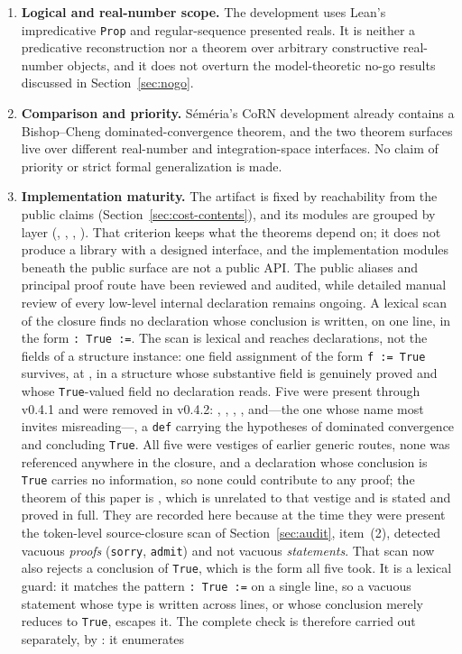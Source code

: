 \documentclass[11pt]{article}
\theoremstyle{definition}
\theoremstyle{remark}
\begin{document}
\begin{enumerate}[label=(\arabic*)]
\item \textbf{Logical and real-number scope.}  The development uses Lean's impredicative \texttt{Prop} and regular-sequence presented reals.  It is neither a predicative reconstruction nor a theorem over arbitrary constructive real-number objects, and it does not overturn the model-theoretic no-go results discussed in Section~\ref{sec:nogo}.

\item \textbf{Comparison and priority.}  S\'em\'eria's CoRN development already contains a Bishop--Cheng dominated-convergence theorem, and the two theorem surfaces live over different real-number and integration-space interfaces.  No claim of priority or strict formal generalization is made.

\item \textbf{Implementation maturity.}  The artifact is fixed by reachability from the public claims (Section~\ref{sec:cost-contents}), and its modules are grouped by layer (, , , ).  That criterion keeps what the theorems depend on; it does not produce a library with a designed interface, and the implementation modules beneath the public surface are not a public API.  The public aliases and principal proof route have been reviewed and audited, while detailed manual review of every low-level internal declaration remains ongoing.  A lexical scan of the closure finds no declaration whose conclusion is written, on one line, in the form \texttt{: True :=}.  The scan is lexical and reaches declarations, not the fields of a structure instance: one field assignment of the form \texttt{f := True} survives, at , in a structure whose substantive field is genuinely proved and whose \texttt{True}-valued field no declaration reads.  Five were present through v0.4.1 and were removed in v0.4.2: , , , , and---the one whose name most invites misreading---, a \texttt{def} carrying the hypotheses of dominated convergence and concluding \texttt{True}.  All five were vestiges of earlier generic routes, none was referenced anywhere in the closure, and a declaration whose conclusion is \texttt{True} carries no information, so none could contribute to any proof; the theorem of this paper is , which is unrelated to that vestige and is stated and proved in full.  They are recorded here because at the time they were present the token-level source-closure scan of Section~\ref{sec:audit}, item~(2), detected vacuous \emph{proofs} (\texttt{sorry}, \texttt{admit}) and not vacuous \emph{statements}.  That scan now also rejects a conclusion of \texttt{True}, which is the form all five took.  It is a lexical guard: it matches the pattern \texttt{: True :=} on a single line, so a vacuous statement whose type is written across lines, or whose conclusion merely reduces to \texttt{True}, escapes it.  The complete check is therefore carried out separately, by : it enumerates 
\end{enumerate}
\end{document}
